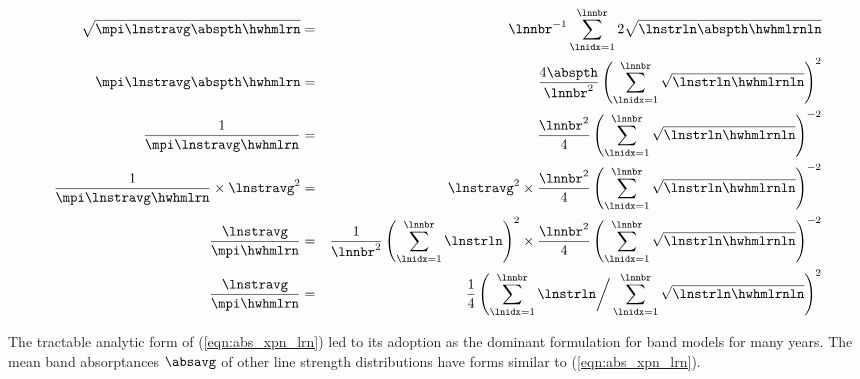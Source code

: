 \documentclass[12pt]{article}
\begin{document}
\begin{eqnarray}
\sqrt{ \mpi \lnstravg \abspth \hwhmlrn } 
& = & 
\lnnbr^{-1} \sum_{\lnidx = 1}^{\lnnbr} 2 \sqrt{ \lnstrln \abspth \hwhmlrnln } 
\nonumber \\
\mpi \lnstravg \abspth \hwhmlrn
& = & 
\frac{4 \abspth}{\lnnbr^{2}} \left( \sum_{\lnidx = 1}^{\lnnbr} \sqrt{ \lnstrln \hwhmlrnln } \right)^{2}
\nonumber \\
\frac{1}{\mpi \lnstravg \hwhmlrn }
& = & 
\frac{\lnnbr^{2}}{4} \left( \sum_{\lnidx = 1}^{\lnnbr} \sqrt{ \lnstrln \hwhmlrnln } \right)^{-2}
\nonumber \\
\frac{1}{\mpi \lnstravg \hwhmlrn } \times \lnstravg^{2}
& = & 
\lnstravg^{2} \times \frac{\lnnbr^{2}}{4} \left( \sum_{\lnidx = 1}^{\lnnbr} \sqrt{ \lnstrln \hwhmlrnln } \right)^{-2}
\nonumber \\
\frac{\lnstravg}{\mpi \hwhmlrn }
& = & 
\frac{1}{\lnnbr^{2}} \left( \sum_{\lnidx = 1}^{\lnnbr} \lnstrln \right)^{2}
\times \frac{\lnnbr^{2}}{4} \left( \sum_{\lnidx = 1}^{\lnnbr} \sqrt{ \lnstrln \hwhmlrnln } \right)^{-2}
\nonumber \\
\frac{\lnstravg}{\mpi \hwhmlrn}
& = & 
\frac{1}{4} \left( \sum_{\lnidx = 1}^{\lnnbr} \lnstrln \bigg/
\sum_{\lnidx = 1}^{\lnnbr} \sqrt{ \lnstrln \hwhmlrnln } \right)^{2}
\end{eqnarray}

The tractable analytic form of (\ref{eqn:abs_xpn_lrn}) led to its
adoption as the dominant formulation for band models for many years.
The mean band absorptances $\absavg$ of other line strength
distributions have forms similar to (\ref{eqn:abs_xpn_lrn}).
\end{document}
